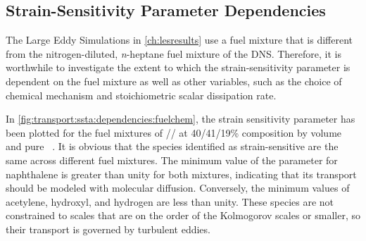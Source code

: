 \subsection{Strain-Sensitivity Parameter Dependencies}
\label{sec:transport:ssta:dependencies}

The Large Eddy Simulations in \cref{ch:lesresults} use a fuel mixture that is different from the nitrogen-diluted, \textit{n}-heptane fuel mixture of the DNS. Therefore, it is worthwhile to investigate the extent to which the strain-sensitivity parameter is dependent on the fuel mixture as well as other variables, such as the choice of chemical mechanism and stoichiometric scalar dissipation rate.

In \cref{fig:transport:ssta:dependencies:fuelchem}, the strain sensitivity parameter has been plotted for the fuel mixtures of // at 40/41/19\% composition by volume~\cite{mahmoud2017} and pure ~\cite{shaddix2010,zhang2011}. It is obvious that the species identified as strain-sensitive are the same across different fuel mixtures. The minimum value of the parameter for naphthalene is greater than unity for both mixtures, indicating that its transport should be modeled with molecular diffusion. Conversely, the minimum values of acetylene, hydroxyl, and hydrogen are less than unity. These species are not constrained to scales that are on the order of the Kolmogorov scales or smaller, so their transport is governed by turbulent eddies.

